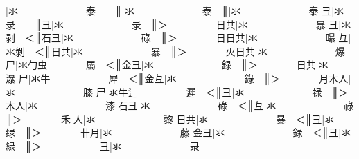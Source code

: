 {\cjk{}{\cnsym{}　　　　　}}|{\cjk{}氺{\cnsym{}　　　　　　　}泰{\cnsym{}　　}}║{\cjk{}{\cnsym{}　　　　　　}}|{\cjk{}氺{\cnsym{}　　　　　　　}泰{\cnsym{}　}}║{\cjk{}{\cnsym{}　　　　　　　}}|{\cjk{}氺{\cnsym{}　　　　　　　}泰} 
{\cjk{}{\cnsym{}　　　　　}彐}|{\cjk{}氺{\cnsym{}　　　　　　　}录{\cnsym{}　　}}║{\cjk{}{\cnsym{}　　　　　　}彐}|{\cjk{}氺{\cnsym{}　　　　　　　}录{\cnsym{}　}}║{\cjk{}＞{\cnsym{}　　　　　}日共}|{\cjk{}氺{\cnsym{}　　　　　　　}暴} 
{\cjk{}{\cnsym{}　　　　　}彐}|{\cjk{}氺剥{\cnsym{}　}＜}║{\cjk{}{\cnsym{}　　　　　}石彐}|{\cjk{}氺{\cnsym{}　　　　　　　}碌{\cnsym{}　}}║{\cjk{}＞{\cnsym{}　　　　}日日共}|{\cjk{}氺{\cnsym{}　　　　　　　}曝} 
{\cjk{}{\cnsym{}　　　　　}彑}|{\cjk{}氺剝{\cnsym{}　}＜}║{\cjk{}{\cnsym{}　　　　　}日共}|{\cjk{}氺{\cnsym{}　　　　　　　}暴{\cnsym{}　}}║{\cjk{}＞{\cnsym{}　　　　}火日共}|{\cjk{}氺{\cnsym{}　　　　　　　}爆} 
{\cjk{}{\cnsym{}　　　　　}尸}|{\cjk{}氺勹虫{\cnsym{}　　　　}屬{\cnsym{}　}＜}║{\cjk{}{\cnsym{}　　　　　}金彐}|{\cjk{}氺{\cnsym{}　　　　　　　}録{\cnsym{}　}}║{\cjk{}＞{\cnsym{}　　　　}日共}|{\cjk{}氺{\cnsym{}　　　　　　　}瀑} 
{\cjk{}{\cnsym{}　　　　　}尸}|{\cjk{}氺牛{\cnsym{}　　　　　　}犀{\cnsym{}　}＜}║{\cjk{}{\cnsym{}　　　　　}金彑}|{\cjk{}氺{\cnsym{}　　　　　　　}錄{\cnsym{}　}}║{\cjk{}＞{\cnsym{}　　　　}月木人}|{\cjk{}氺{\cnsym{}　　　　　　　}膝} 
{\cjk{}{\cnsym{}　　　　　}尸}|{\cjk{}氺牛辶{\cnsym{}　　　　　}遲{\cnsym{}　}＜}║{\cjk{}{\cnsym{}　　　　　}彐}|{\cjk{}氺{\cnsym{}　　　　　　　}禄{\cnsym{}　}}║{\cjk{}＞{\cnsym{}　　　　}木人}|{\cjk{}氺{\cnsym{}　　　　　　　}漆} 
{\cjk{}{\cnsym{}　　　　}石彐}|{\cjk{}氺{\cnsym{}　　　　　　　}碌{\cnsym{}　}＜}║{\cjk{}{\cnsym{}　　　　　}彑}|{\cjk{}氺{\cnsym{}　　　　　　　}祿{\cnsym{}　}}║{\cjk{}＞{\cnsym{}　　　　}禾{\cnjzr{}}人}|{\cjk{}氺{\cnsym{}　　　　　　　}黎} 
{\cjk{}{\cnsym{}　　　　}日共}|{\cjk{}氺{\cnsym{}　　　　　　　}暴{\cnsym{}　}＜}║{\cjk{}{\cnsym{}　　　　　}彐}|{\cjk{}氺{\cnsym{}　　　　　　　}绿{\cnsym{}　}}║{\cjk{}＞{\cnsym{}　　　　}卄月}|{\cjk{}氺{\cnsym{}　　　　　　　}藤} 
{\cjk{}{\cnsym{}　　　　}金彐}|{\cjk{}氺{\cnsym{}　　　　　　　}録{\cnsym{}　}＜}║{\cjk{}{\cnsym{}　　　　　}彐}|{\cjk{}氺{\cnsym{}　　　　　　　}緑{\cnsym{}　}}║{\cjk{}＞{\cnsym{}　　　　　　}彐}|{\cjk{}氺{\cnsym{}　　　　　　　}录} 
